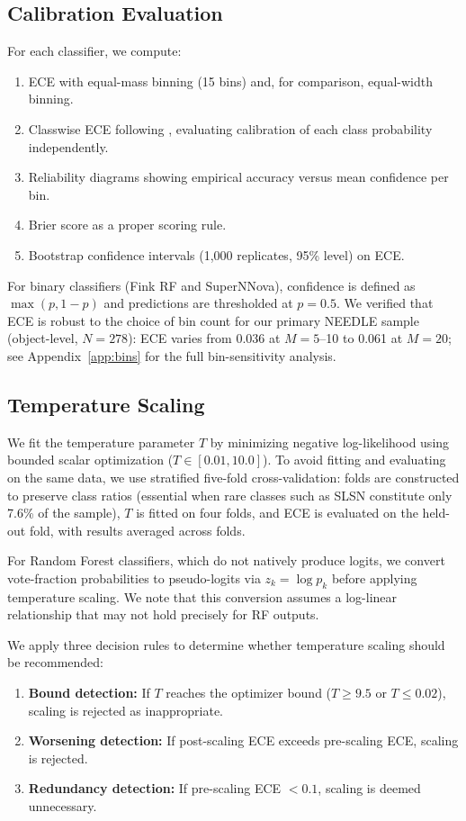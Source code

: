 \documentclass[twocolumn]{aastex631}
\begin{document}
\subsection{Calibration Evaluation}

For each classifier, we compute:
\begin{enumerate}
    \item ECE with equal-mass binning (15 bins) and, for comparison, equal-width binning.
    \item Classwise ECE following \citet{nixon2019}, evaluating calibration of each class probability independently.
    \item Reliability diagrams showing empirical accuracy versus mean confidence per bin.
    \item Brier score as a proper scoring rule.
    \item Bootstrap confidence intervals (1,000 replicates, 95\% level) on ECE.
\end{enumerate}

For binary classifiers (Fink RF and SuperNNova), confidence is defined as $\max(p, 1-p)$ and predictions are thresholded at $p = 0.5$. We verified that ECE is robust to the choice of bin count for our primary NEEDLE sample (object-level, $N = 278$): ECE varies from 0.036 at $M = 5$--10 to 0.061 at $M = 20$; see Appendix~\ref{app:bins} for the full bin-sensitivity analysis.

\subsection{Temperature Scaling}

We fit the temperature parameter $T$ by minimizing negative log-likelihood using bounded scalar optimization ($T \in [0.01, 10.0]$). To avoid fitting and evaluating on the same data, we use stratified five-fold cross-validation: folds are constructed to preserve class ratios (essential when rare classes such as SLSN constitute only 7.6\% of the sample), $T$ is fitted on four folds, and ECE is evaluated on the held-out fold, with results averaged across folds.

For Random Forest classifiers, which do not natively produce logits, we convert vote-fraction probabilities to pseudo-logits via $z_k = \log p_k$ before applying temperature scaling. We note that this conversion assumes a log-linear relationship that may not hold precisely for RF outputs.

We apply three decision rules to determine whether temperature scaling should be recommended:
\begin{enumerate}
    \item \textbf{Bound detection:} If $T$ reaches the optimizer bound ($T \geq 9.5$ or $T \leq 0.02$), scaling is rejected as inappropriate.
    \item \textbf{Worsening detection:} If post-scaling ECE exceeds pre-scaling ECE, scaling is rejected.
    \item \textbf{Redundancy detection:} If pre-scaling ECE $< 0.1$, scaling is deemed unnecessary.
\end{enumerate}
\end{document}
